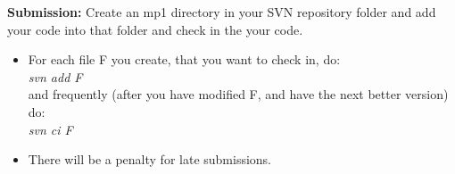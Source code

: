 \documentclass{article}
\begin{document}
\textbf{Submission:}
Create an mp1 directory in your SVN repository folder and add your code into
that folder and check in the your code.
\begin{itemize}
\item  For each file F you create, that you want to check in, do: \\
        \textit{svn add F}\\
        and frequently (after you have modified F, and have the next better
        version) do:\\ 
        \textit{svn ci F}
\item  There will be a penalty for late submissions.
\end{itemize}
\end{document}
